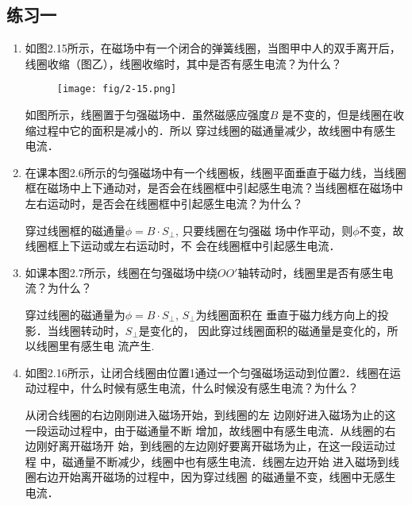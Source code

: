 \subsection{练习一}
\begin{enumerate}
    \item 如图2.15所示，在磁场中有一个闭合的弹簧线圈，当图甲中人的双手离开后，线圈收缩（图乙），线圈收缩时，其中是否有感生电流？为什么？
\begin{figure}[htp]\centering
\texttt{[image: fig/2-15.png]}
\caption{}
\end{figure}


\begin{solution}
    如图所示，线圈置于匀强磁场中．虽然磁感应强度$B$
    是不变的，但是线圈在收缩过程中它的面积是减小的．所以
    穿过线圈的磁通量减少，故线圈中有感生电流．
\end{solution}

    \item 在课本图2.6所示的匀强磁场中有一个线圈板，线圈平面垂直于磁力线，当线圈框在磁场中上下通动对，是否会在线圈框中引起感生电流？当线圈框在磁场中左右运动时，是否会在线圈框中引起感生电流？为什么？


\begin{solution}
    穿过线圈框的磁通量$\phi=B\cdot S_{\bot}$, 只要线圈在匀强磁
    场中作平动，则$\phi$不变，故线圈框上下运动或左右运动时，不
    会在线圈框中引起感生电流．
\end{solution}

    \item 如课本图2.7所示，线圈在匀强磁场中绕$OO'$轴转动时，线圈里是否有感生电流？为什么？

    \begin{solution}
        穿过线圈的磁通量为$\phi=B\cdot S_{\bot}$, $S_{\bot}$为线圈面积在
        垂直于磁力线方向上的投影．当线圈转动时，$S_{\bot}$是变化的，
        因此穿过线圈面积的磁通量是变化的，所以线圈里有感生电
        流产生.
    \end{solution}
    
    \item 如图2.16所示，让闭合线圈由位置1通过一个匀强磁场运动到位置2．线圈在运动过程中，什么时候有感生电流，什么时候没有感生电流？为什么？

    \begin{solution}
        从闭合线圈的右边刚刚进入磁场开始，到线圈的左
        边刚好进入磁场为止的这一段运动过程中，由于磁通量不断
        增加，故线圈中有感生电流．从线圈的右边刚好离开磁场开
        始，到线圈的左边刚好要离开磁场为止，在这一段运动过程
        中，磁通量不断减少，线圈中也有感生电流．线圈左边开始
        进入磁场到线圈右边开始离开磁场的过程中，因为穿过线圈
        的磁通量不变，线圈中无感生电流．
    \end{solution}
    

\end{enumerate}
